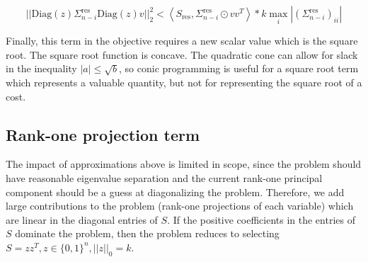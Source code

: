 \documentclass{article}
\begin{document}
$$
|| \text{Diag}(z) \Sigma_{n-i}^\text{res} \text{Diag}(z) v ||_2^2
< \left< S_\text{res}, \Sigma_{n-i}^\text{res} \odot v v^T \right>
* k \max_{i} \left| \left( \Sigma_{n-i}^\text{res} \right)_{ii} \right|
$$

Finally, this term in the objective requires a new scalar value which is the square root. The square root function is concave. The quadratic cone can allow for slack in the inequality $|a| \le \sqrt{b}$, so conic programming is useful for a square root term which represents a valuable quantity, but not for representing the square root of a cost.






\subsection{Rank-one projection term}

The impact of approximations above is limited in scope, since the problem should have reasonable eigenvalue separation and the current rank-one principal component should be a guess at diagonalizing the problem. Therefore, we add large contributions to the problem (rank-one projections of each variable) which are linear in the diagonal entries of $S$. If the positive coefficients in the entries of $S$ dominate the problem, then the problem reduces to selecting $S = z z^T, z \in \{0,1\}^n, ||z||_0 = k$.

\end{document}
